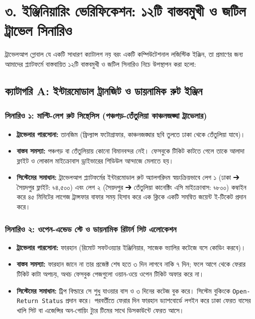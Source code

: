 \documentclass[11pt,a4paper]{article}
\begin{document}
\newpage

\section{৩. ইঞ্জিনিয়ারিং ভেরিফিকেশন: ১২টি বাস্তবমুখী ও জটিল ট্রাভেল সিনারিও}

ট্রাভেলআপ গ্লোবাল যে একটি সাধারণ ক্যাটালগ নয় বরং একটি কম্পিউটেশনাল লজিস্টিক ইঞ্জিন, তা প্রমাণের জন্য আমাদের প্ল্যাটফর্মে বাস্তবায়িত ১২টি বাস্তবমুখী ও জটিল সিনারিও নিচে উপস্থাপন করা হলো:

\subsection{ক্যাটাগরি A: ইন্টারমোডাল ট্রানজিট ও ডায়নামিক রুট ইঞ্জিন}

\subsubsection{সিনারিও ১: মাল্টি-লেগ রুট সিন্থেসিস (পঞ্চগড়-তেঁতুলিয়া কাঞ্চনজঙ্ঘা ট্রাভেলার)}
\begin{itemize}[leftmargin=*]
    \item \textbf{ট্রাভেলার পারসোনা:} তানজিম (ফ্রিল্যান্স ফটোগ্রাফার, কাঞ্চনজঙ্ঘার ছবি তুলতে ঢাকা থেকে তেঁতুলিয়া যাবে)।
    \item \textbf{বাস্তব সমস্যা:} পঞ্চগড় বা তেঁতুলিয়ায় কোনো বিমানবন্দর নেই। ফেসবুকে টিকিট কাটতে গেলে তাকে আলাদা ফ্লাইট ও লোকাল মাইক্রোবাস ড্রাইভারের শিডিউল আন্দাজে মেলাতে হয়।
    \item \textbf{সিস্টেমের সমাধান:} ট্রাভেলআপ প্ল্যাটফর্মের ইন্টারমোডাল রুট অ্যালগরিদম স্বয়ংক্রিয়ভাবে লেগ ১ (ঢাকা ➔ সৈয়দপুর ফ্লাইট: ৳৪,৫০০) এবং লেগ ২ (সৈয়দপুর ➔ তেঁতুলিয়া কানেক্টিং এসি মাইক্রোবাস: ৳৮০০) কম্বাইন করে ৪৫ মিনিটের লাগেজ ট্রান্সফার বাফার সময় হিসাব করে এক ক্লিকে একটি সমন্বিত জয়েন্ট ই-টিকেট প্রদান করে।
\end{itemize}

\subsubsection{সিনারিও ২: ওপেন-এন্ডেড স্টে ও ডায়নামিক রিটার্ন সিট এলোকেশন}
\begin{itemize}[leftmargin=*]
    \item \textbf{ট্রাভেলার পারসোনা:} ফারহান (রিমোট সফটওয়্যার ইঞ্জিনিয়ার, সাজেক ভ্যালির কটেজে বসে কোডিং করবে)।
    \item \textbf{বাস্তব সমস্যা:} ফারহান জানে না তার প্রজেক্ট শেষ হতে ৩ দিন লাগবে নাকি ৭ দিন; ফলে আগে থেকে ফেরার টিকিট কাটা অপচয়, অথচ ফেসবুক পেজগুলো ওয়ান-ওয়ে ওপেন টিকিট অফার করে না।
    \item \textbf{সিস্টেমের সমাধান:} ট্রিপ বিল্ডারে সে শুধু যাওয়ার বাস ও ৩ দিনের কটেজ বুক করে। সিস্টেম বুকিংকে \texttt{Open-Return Status} প্রদান করে। পরবর্তীতে ফেরার দিন ফারহান ড্যাশবোর্ডে লগইন করে ঢাকা ফেরত বাসের খালি সিট বা এজেন্সির অন-গোয়িং ট্যুর টিমের সাথে ডিসকাউন্টে ফেরত আসে।
\end{itemize}
\end{document}
